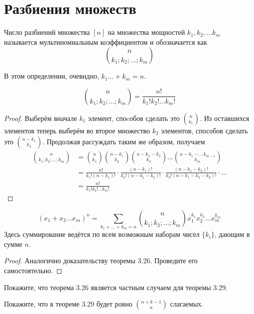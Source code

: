 \section{Разбиения множеств}

\begin{definition}
Число разбиений множества $[n]$ на множества мощностей $k_1, k_2, \ldots k_m$ называется мультиномиальным коэффициентом и обозначается как
$$n \choose k_1; k_2;\ldots; k_m$$
\end{definition}

В этом определении, очевидно, $k_1\ldots+ k_m = n$.

\begin{thm}
$${n \choose k_1; k_2;\ldots; k_m} = \frac{n!}{k_1!k_2!\ldots k_m!}$$
\end{thm}
\begin{proof}
Выберём вначале $k_1$ элемент, споcобов сделать это $n\choose k_1$. Из оставшихся элементов теперь выберём во второе множество $k_2$ элементов, способов сделать это $n-k_1\choose k_2$. Продолжая рассуждать таким же образом, получаем
\begin{align*}
{n \choose k_1; k_2;\ldots; k_m} & = {n\choose k_1}{n-k_1\choose k_2}{n-k_1-k_2\choose k_3}\ldots{n-k_1-\ldots k_{m-1}\choose k_m} \\
&= \frac{n!}{k_1!(n-k_1)!}\cdot\frac{(n-k_1)!}{k_2!(n-k_1-k_2)!}\cdot\frac{(n-k_1-k_2)!}{k_3!(n-k_1-k_2-k_3)!}\cdot\ldots\\
&=\frac{n!}{k_1!k_2!\ldots k_m!}
\end{align*}
\end{proof}

\begin{thm}
$$(x_1+x_2\ldots x_m)^n = \sum_{k_1+\ldots + k_m = n}{n\choose k_1;k_2;\ldots;k_m}x_1^{k_1}x_2^{k_2}\ldots x_m^{k_m}$$
Здесь суммирование ведётся по всем возможным наборам чисел $\{k_i\}$, дающим в сумме $n$.
\end{thm}
\begin{proof}
Аналогично доказательству теоремы 3.26. Проведите его самостоятельно.
\end{proof}

\begin{exercise}
Покажите, что теорема 3.26 является частным случаем для теоремы 3.29.
\end{exercise}

\begin{exercise}
Покажите, что в теореме 3.29 будет ровно $n + k - 1 \choose n$ слагаемых.
\end{exercise}

